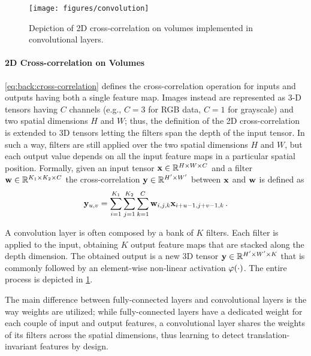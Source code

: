 \begin{figure}
    \centering
    \texttt{[image: figures/convolution]}
    \caption{Depiction of 2D cross-correlation on volumes implemented in convolutional layers.}
    \label{fig:back:convolution}
\end{figure}

\paragraph{2D Cross-correlation on Volumes}
\ref{eq:back:cross-correlation} defines the cross-correlation operation for inputs and outputs having both a single feature map.
Images instead are represented as 3-D tensors having $C$ channels (e.g., $C=3$ for RGB data, $C=1$ for grayscale) and two spatial dimensions $H$ and $W$;
thus, the definition of the 2D cross-correlation is extended to 3D tensors letting the filters span the depth of the input tensor.
In such a way, filters are still applied over the two spatial dimensions $H$ and $W$, but each output value depends on all the input feature maps in a particular spatial position.
Formally, given an input tensor $\mathbf{x} \in \mathbb{R}^{H \times W \times C}$ and a filter $\mathbf{w} \in \mathbb{R}^{K_1 \times K_2 \times C}$ the cross-correlation $\mathbf{y} \in \mathbb{R}^{H' \times W'}$ between $\mathbf{x}$ and $\mathbf{w}$ is defined as
%
\begin{equation}\label{eq:back:channel-cross-correlation}
    \mathbf{y}_{u,v} = \sum_{i=1}^{K_1} \sum_{j=1}^{K_2} \sum_{k=1}^C \mathbf{w}_{i,j,k} \mathbf{x}_{i+u-1,j+v-1,k} \,.
\end{equation}

A convolution layer is often composed by a bank of $K$ filters.
Each filter is applied to the input, obtaining $K$ output feature maps that are stacked along the depth dimension.
The obtained output is a new 3D tensor $\mathbf{y} \in \mathbb{R}^{H' \times W' \times K}$ that is commonly followed by an element-wise non-linear activation $\varphi(\cdot)$.
The entire process is depicted in \ref{fig:back:convolution}.

The main difference between fully-connected layers and convolutional layers is the way weights are utilized;
while fully-connected layers have a dedicated weight for each couple of input and output features, a convolutional layer shares the weights of its filters across the spatial dimensions, thus learning to detect translation-invariant features by design.

